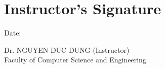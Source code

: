 \chapter*{Instructor’s Signature}

\vspace{1cm}

\makebox[0.7\linewidth][l]{\hrulefill} Date: \makebox[0.2\linewidth][l]{\hrulefill}

    \begin{flushleft}
    Dr. NGUYEN DUC DUNG (Instructor)\\
    Faculty of Computer Science and Engineering
    \end{flushleft}